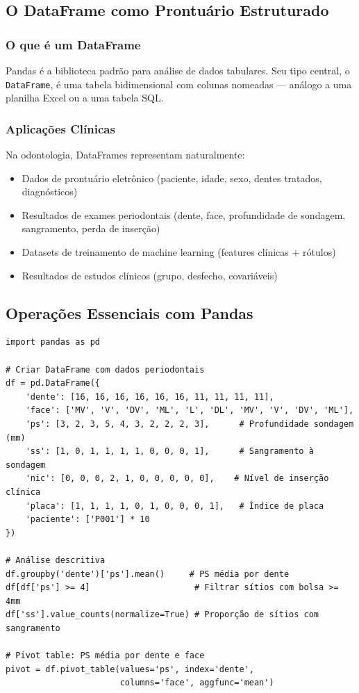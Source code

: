 \subsection{O DataFrame como Prontuário Estruturado}

\subsubsection{O que é um DataFrame}

Pandas  é a biblioteca padrão para análise de dados tabulares. Seu tipo central, o \texttt{DataFrame}, é uma tabela bidimensional com colunas nomeadas — análogo a uma planilha Excel ou a uma tabela SQL.

\subsubsection{Aplicações Clínicas}

Na odontologia, DataFrames representam naturalmente:
\begin{itemize}
    \item Dados de prontuário eletrônico (paciente, idade, sexo, dentes tratados, diagnósticos)
    \item Resultados de exames periodontais (dente, face, profundidade de sondagem, sangramento, perda de inserção)
    \item Datasets de treinamento de machine learning (features clínicas + rótulos)
    \item Resultados de estudos clínicos (grupo, desfecho, covariáveis)
\end{itemize}

\subsection{Operações Essenciais com Pandas}

\begin{verbatim}
import pandas as pd

# Criar DataFrame com dados periodontais
df = pd.DataFrame({
    'dente': [16, 16, 16, 16, 16, 16, 11, 11, 11, 11],
    'face': ['MV', 'V', 'DV', 'ML', 'L', 'DL', 'MV', 'V', 'DV', 'ML'],
    'ps': [3, 2, 3, 5, 4, 3, 2, 2, 2, 3],      # Profundidade sondagem (mm)
    'ss': [1, 0, 1, 1, 1, 1, 0, 0, 0, 1],      # Sangramento à sondagem
    'nic': [0, 0, 0, 2, 1, 0, 0, 0, 0, 0],    # Nível de inserção clínica
    'placa': [1, 1, 1, 1, 0, 1, 0, 0, 0, 1],   # Índice de placa
    'paciente': ['P001'] * 10
})

# Análise descritiva
df.groupby('dente')['ps'].mean()     # PS média por dente
df[df['ps'] >= 4]                     # Filtrar sítios com bolsa >= 4mm
df['ss'].value_counts(normalize=True) # Proporção de sítios com sangramento

# Pivot table: PS média por dente e face
pivot = df.pivot_table(values='ps', index='dente',
                       columns='face', aggfunc='mean')
\end{verbatim}

